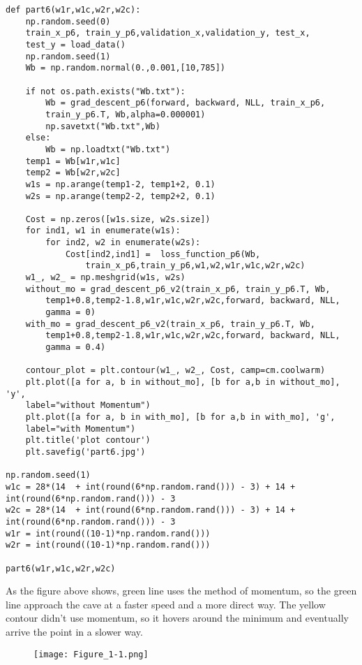 \documentclass{article}
\begin{document}
\Large\begin{lstlisting}[basicstyle=\large\ttfamily]
def part6(w1r,w1c,w2r,w2c):    
    np.random.seed(0)
    train_x_p6, train_y_p6,validation_x,validation_y, test_x,
    test_y = load_data()
    np.random.seed(1)
    Wb = np.random.normal(0.,0.001,[10,785])
    
    if not os.path.exists("Wb.txt"):
        Wb = grad_descent_p6(forward, backward, NLL, train_x_p6,
        train_y_p6.T, Wb,alpha=0.000001)
        np.savetxt("Wb.txt",Wb)
    else:
        Wb = np.loadtxt("Wb.txt")
    temp1 = Wb[w1r,w1c]
    temp2 = Wb[w2r,w2c]
    w1s = np.arange(temp1-2, temp1+2, 0.1)
    w2s = np.arange(temp2-2, temp2+2, 0.1)
    
    Cost = np.zeros([w1s.size, w2s.size])
    for ind1, w1 in enumerate(w1s):
        for ind2, w2 in enumerate(w2s):
            Cost[ind2,ind1] =  loss_function_p6(Wb,   
                train_x_p6,train_y_p6,w1,w2,w1r,w1c,w2r,w2c)
    w1_, w2_ = np.meshgrid(w1s, w2s)
    without_mo = grad_descent_p6_v2(train_x_p6, train_y_p6.T, Wb,
        temp1+0.8,temp2-1.8,w1r,w1c,w2r,w2c,forward, backward, NLL, 
        gamma = 0)
    with_mo = grad_descent_p6_v2(train_x_p6, train_y_p6.T, Wb,
        temp1+0.8,temp2-1.8,w1r,w1c,w2r,w2c,forward, backward, NLL, 
        gamma = 0.4)
    
    contour_plot = plt.contour(w1_, w2_, Cost, camp=cm.coolwarm)
    plt.plot([a for a, b in without_mo], [b for a,b in without_mo], 'y', 
    label="without Momentum")
    plt.plot([a for a, b in with_mo], [b for a,b in with_mo], 'g', 
    label="with Momentum")
    plt.title('plot contour')
    plt.savefig('part6.jpg')

np.random.seed(1)
w1c = 28*(14  + int(round(6*np.random.rand())) - 3) + 14 +
int(round(6*np.random.rand())) - 3
w2c = 28*(14  + int(round(6*np.random.rand())) - 3) + 14 +
int(round(6*np.random.rand())) - 3
w1r = int(round((10-1)*np.random.rand()))
w2r = int(round((10-1)*np.random.rand()))

part6(w1r,w1c,w2r,w2c)
\end{lstlisting}
As the figure above shows, green line uses the method of momentum, so the green line approach the cave at a faster speed and a more direct way. The yellow contour didn't use momentum, so it hovers around the minimum and eventually arrive the point in a slower way.

\begin{figure}[!htb]
  \texttt{[image: Figure\_1-1.png]}
  \caption*{}
\end{figure}
\end{document}
